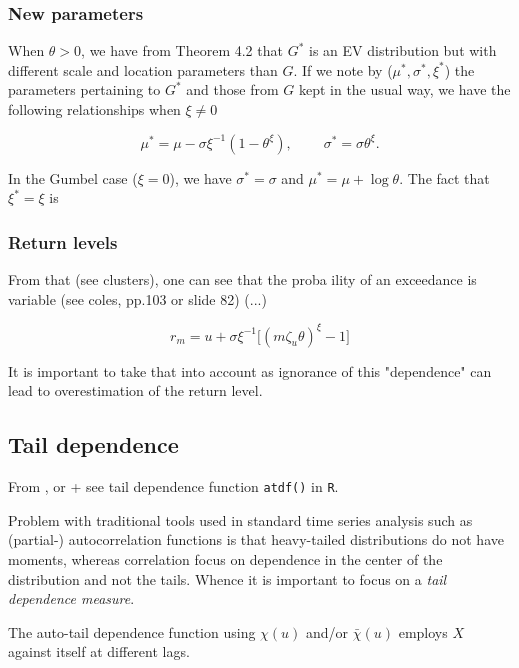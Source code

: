 \documentclass[11pt,a4paper,openany ]{book}
\begin{document}
\subsubsection*{New parameters} When $\theta>0$, we have from Theorem 4.2 that $G^*$ is an EV distribution but with different scale and location parameters than $G$. If we note by ($\mu^*,\sigma^*,\xi^*$) the parameters pertaining to $G^*$ and those from $G$ kept in the usual way, we have the following relationships when $\xi\neq 0$

\begin{equation}
\mu^* = \mu-\sigma\xi^{-1}(1-\theta^{\xi}), \ \ \ \ \ \ \ \ \ \ \sigma^*=\sigma\theta^{\xi}.
\end{equation}

In the Gumbel case ($\xi=0$), we have $\sigma^*=\sigma$ and $\mu^*=\mu+\log\theta$.
The fact that $\xi^*=\xi$ is 


\subsubsection*{Return levels}

From that (see clusters), one can see that the proba ility of an exceedance is variable (see coles, pp.103 or slide 82) (...)

\begin{equation}
r_m = u + \sigma\xi^{-1}\Big[(m\zeta_u\theta)^{\xi}-1\Big]
\end{equation}

It is important to take that into account as ignorance of this "dependence" can lead to overestimation of the return level.

\subsection{Tail dependence}
From \cite[section 2.6]{reiss_statistical_2007}, \cite[section 8.4]{coles_introduction_2001} or \cite[section 9.4.1,10.3.4]{beirlant_practical_1996} + see tail dependence function \texttt{atdf()} in \texttt{R}.

Problem with traditional tools used in standard time series analysis such as (partial-) autocorrelation functions is that heavy-tailed distributions do not have moments, whereas correlation focus on dependence in the center of the distribution and not the tails. \citet[pp.134]{wada_extreme_2016} Whence it is important to focus on a \textit{tail dependence measure}.

The auto-tail dependence function using $\chi(u)$ and/or $\bar{\chi}(u)$ employs $X$ against itself at different lags.
\end{document}
